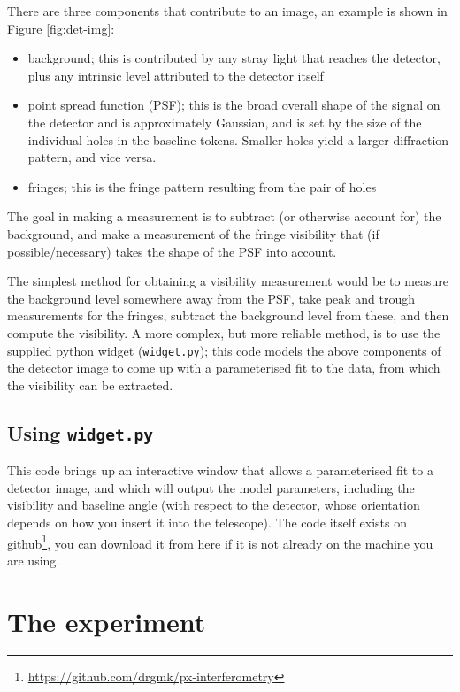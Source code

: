 \documentclass[11pt]{article}
\begin{document}
There are three components that contribute to an image, an example is shown in Figure \ref{fig:det-img}:
\begin{itemize}
    \item background; this is contributed by any stray light that reaches the detector, plus any intrinsic level attributed to the detector itself
    \item point spread function (PSF); this is the broad overall shape of the signal on the detector and is approximately Gaussian, and is set by the size of the individual holes in the baseline tokens. Smaller holes yield a larger diffraction pattern, and vice versa.
    \item fringes; this is the fringe pattern resulting from the pair of holes
\end{itemize}
The goal in making a measurement is to subtract (or otherwise account for) the background, and make a measurement of the fringe visibility that (if possible/necessary) takes the shape of the PSF into account.

The simplest method for obtaining a visibility measurement would be to measure the background level somewhere away from the PSF, take peak and trough measurements for the fringes, subtract the background level from these, and then compute the visibility. A more complex, but more reliable method, is to use the supplied python widget (\texttt{widget.py}); this code models the above components of the detector image to come up with a parameterised fit to the data, from which the visibility can be extracted.

\subsection{Using \texttt{widget.py}}\label{sec:widget}

This code brings up an interactive window that allows a parameterised fit to a detector image, and which will output the model parameters, including the visibility and baseline angle (with respect to the detector, whose orientation depends on how you insert it into the telescope). The code itself exists on github\footnote{\href{https://github.com/drgmk/px-interferometry}{https://github.com/drgmk/px-interferometry}}, you can download it from here if it is not already on the machine you are using.

\section{The experiment}
\end{document}
